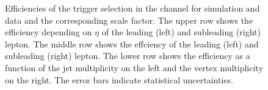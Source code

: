 \begin{figure}[htbp!]
\begin{center}
      \caption{Efficiencies of the trigger selection in the \mumu channel for simulation and data and the corresponding scale factor. The upper row shows the efficiency depending on $\eta$ of the leading (left) and subleading (right) lepton. The middle row shows the effciency \pt of the leading (left) and subleading (right) lepton. The lower row shows the efficiency as a function of the jet multiplicity on the left and the vertex multiplicity on the right.
      The error bars indicate statistical uncertainties. }  
      
    \label{fig:MET_mumu}
  \end{center}
\end{figure}

